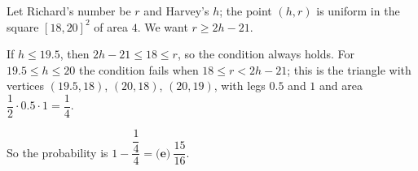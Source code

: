 Let Richard's number be $r$ and Harvey's $h$; the point $(h,r)$ is uniform in the square $[18,20]^2$ of area $4$. We want $r\ge2h-21$.

If $h\le19.5$, then $2h-21\le18\le r$, so the condition always holds. For $19.5\le h\le20$ the condition fails when $18\le r<2h-21$; this is the triangle with vertices $(19.5,18)$, $(20,18)$, $(20,19)$, with legs $0.5$ and $1$ and area $\dfrac{1}{2}\cdot0.5\cdot1=\dfrac{1}{4}$.

So the probability is $1-\dfrac{\dfrac{1}{4}}{4}=\boxed{\textbf{(e)}\ \dfrac{15}{16}}$.
